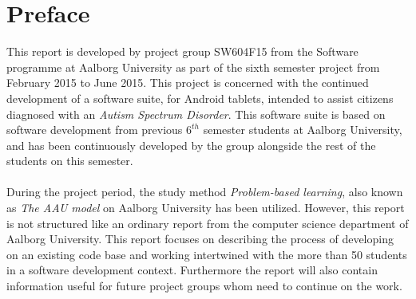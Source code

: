 
\chapter*{Preface}

This report is developed by project group SW604F15 from the Software programme at Aalborg University as part of the sixth semester project from February 2015 to June 2015. This project is concerned with the continued development of a software suite, for Android tablets, intended to assist citizens diagnosed with an \emph{Autism Spectrum Disorder}. This software suite is based on software development from previous $6^{th}$ semester students at Aalborg University, and has been continuously developed by the group alongside the rest of the students on this semester. 
\\\\
During the project period, the study method \emph{Problem-based learning}, also known as \emph{The AAU model} on Aalborg University has been utilized. However, this report is not structured like an ordinary report from the computer science department of Aalborg University. This report focuses on describing the process of developing on an existing code base and working intertwined with the more than 50 students in a software development context. Furthermore the report will also contain information useful for future project groups whom need to continue on the work.

